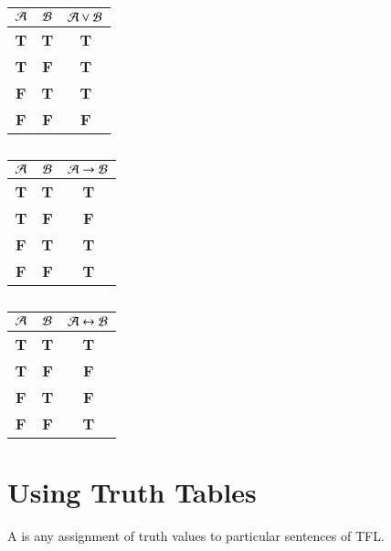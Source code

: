 \documentclass[12pt, a4paper, twoside, openright, titlepage]{book}
\begin{document}
\begin{table}[H]
    \centering
    \caption{}
    \begin{tabular}{cc|c}
        $\mathcal{A}$ & $\mathcal{B}$ & $\mathcal{A}\lor \mathcal{B}$ \\ \hline
        \textbf{T} & \textbf{T} & \textbf{T} \\
        \textbf{T} & \textbf{F} & \textbf{T} \\
        \textbf{F} & \textbf{T} & \textbf{T} \\
        \textbf{F} & \textbf{F} & \textbf{F}
    \end{tabular}
\end{table}


\begin{table}[H]
    \centering
    \caption{}
    \begin{tabular}{cc|c}
        $\mathcal{A}$ & $\mathcal{B}$ & $\mathcal{A} \rightarrow \mathcal{B}$ \\ \hline
        \textbf{T} & \textbf{T} & \textbf{T} \\
        \textbf{T} & \textbf{F} & \textbf{F} \\
        \textbf{F} & \textbf{T} & \textbf{T} \\
        \textbf{F} & \textbf{F} & \textbf{T}
    \end{tabular}
\end{table}


\begin{table}[H]
    \centering
    \caption{}
    \begin{tabular}{cc|c}
        $\mathcal{A}$ & $\mathcal{B}$ & $\mathcal{A} \leftrightarrow \mathcal{B}$\\ \hline
        \textbf{T} & \textbf{T} & \textbf{T} \\
        \textbf{T} & \textbf{F} & \textbf{F} \\
        \textbf{F} & \textbf{T} & \textbf{F} \\
        \textbf{F} & \textbf{F} & \textbf{T}
    \end{tabular}
\end{table}

\section{\textsection Using Truth Tables}

\begin{defn}{}{}
    A  is any assignment of truth values to particular sentences of TFL.
\end{defn}
\end{document}
